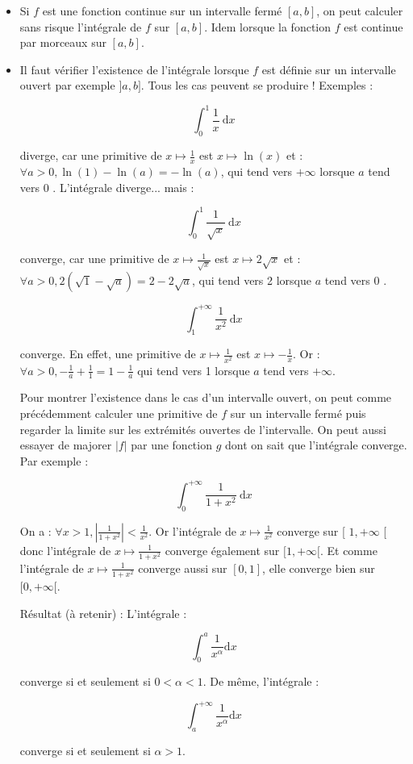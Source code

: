 \begin{itemize}
    \item Si $f$ est une fonction continue sur un intervalle fermé $[a, b]$, on peut calculer sans risque l'intégrale de $f$ sur $[a, b]$. Idem lorsque la fonction $f$ est continue par morceaux sur $[a, b]$.
    \item Il faut vérifier l'existence de l'intégrale lorsque $f$ est définie sur un intervalle ouvert par exemple $] a, b]$. Tous les cas peuvent se produire ! Exemples :

    $$
    \int_0^1 \frac{1}{x} \mathrm{~d} x
    $$
    
    diverge, car une primitive de $x \mapsto \frac{1}{x}$ est $x \mapsto \ln (x)$ et : $\forall a>0, \ln (1)-\ln (a)=-\ln (a)$, qui tend vers $+\infty$ lorsque $a$ tend vers 0 . L'intégrale diverge... mais :
    
    $$
    \int_0^1 \frac{1}{\sqrt{x}} \mathrm{~d} x
    $$
    
    converge, car une primitive de $x \mapsto \frac{1}{\sqrt{x}}$ est $x \mapsto 2 \sqrt{x}$ et : $\forall a>0,2(\sqrt{1}-\sqrt{a})=2-2 \sqrt{a}$, qui tend vers 2 lorsque $a$ tend vers 0 .
    
    $$
    \int_1^{+\infty} \frac{1}{x^2} \mathrm{~d} x
    $$
    
    converge. En effet, une primitive de $x \mapsto \frac{1}{x^2}$ est $x \mapsto-\frac{1}{x}$. Or : $\forall a>0,-\frac{1}{a}+\frac{1}{1}=1-\frac{1}{a}$ qui tend vers 1 lorsque $a$ tend vers $+\infty$.
    
    Pour montrer l'existence dans le cas d'un intervalle ouvert, on peut comme précédemment calculer une primitive de $f$ sur un intervalle fermé puis regarder la limite sur les extrémités ouvertes de l'intervalle. On peut aussi essayer de majorer $|f|$ par une fonction $g$ dont on sait que l'intégrale converge. Par exemple :
    
    $$
    \int_0^{+\infty} \frac{1}{1+x^2} \mathrm{~d} x
    $$
    
    
    On a : $\forall x>1,\left|\frac{1}{1+x^2}\right|<\frac{1}{x^2}$. Or l'intégrale de $x \mapsto \frac{1}{x^2}$ converge sur [ $1,+\infty$ [ donc l'intégrale de $x \mapsto \frac{1}{1+x^2}$ converge également sur $[1,+\infty[$. Et comme l'intégrale de $x \mapsto \frac{1}{1+x^2}$ converge aussi sur $[0,1]$, elle converge bien sur $[0,+\infty[$.
    
    Résultat (à retenir) : L'intégrale :
    
    $$
    \int_0^a \frac{1}{x^\alpha} \mathrm{d} x
    $$
    
    converge si et seulement si $0<\alpha<1$.
    De même, l'intégrale :
    
    $$
    \int_a^{+\infty} \frac{1}{x^\alpha} \mathrm{d} x
    $$
    
    converge si et seulement si $\alpha>1$.
\end{itemize}


